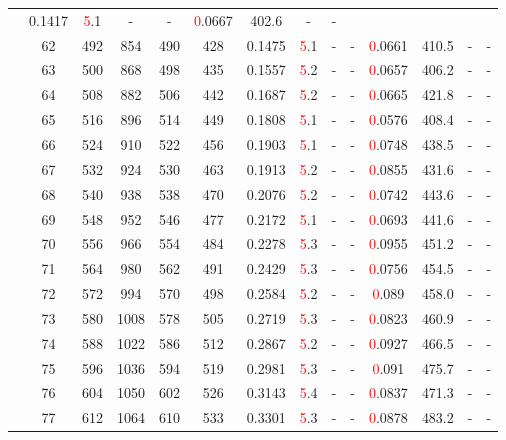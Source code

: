 \begin{table}[htb]
{\begin{tabular}{|c|c|c|c|c|c|c|c|c|c|c|c|c|c|}
 & 0.1417 & \textcolor{red}5.1
 & - & -
 & \textcolor{red}0.0667 & 402.6
 & - & -
 \\
 & 
62 & 492 & 854 & 490 & 428
 & 0.1475 & \textcolor{red}5.1
 & - & -
 & \textcolor{red}0.0661 & 410.5
 & - & -
 \\
 & 
63 & 500 & 868 & 498 & 435
 & 0.1557 & \textcolor{red}5.2
 & - & -
 & \textcolor{red}0.0657 & 406.2
 & - & -
 \\
 & 
64 & 508 & 882 & 506 & 442
 & 0.1687 & \textcolor{red}5.2
 & - & -
 & \textcolor{red}0.0665 & 421.8
 & - & -
 \\
 & 
65 & 516 & 896 & 514 & 449
 & 0.1808 & \textcolor{red}5.1
 & - & -
 & \textcolor{red}0.0576 & 408.4
 & - & -
 \\
 & 
66 & 524 & 910 & 522 & 456
 & 0.1903 & \textcolor{red}5.1
 & - & -
 & \textcolor{red}0.0748 & 438.5
 & - & -
 \\
 & 
67 & 532 & 924 & 530 & 463
 & 0.1913 & \textcolor{red}5.2
 & - & -
 & \textcolor{red}0.0855 & 431.6
 & - & -
 \\
 & 
68 & 540 & 938 & 538 & 470
 & 0.2076 & \textcolor{red}5.2
 & - & -
 & \textcolor{red}0.0742 & 443.6
 & - & -
 \\
 & 
69 & 548 & 952 & 546 & 477
 & 0.2172 & \textcolor{red}5.1
 & - & -
 & \textcolor{red}0.0693 & 441.6
 & - & -
 \\
 & 
70 & 556 & 966 & 554 & 484
 & 0.2278 & \textcolor{red}5.3
 & - & -
 & \textcolor{red}0.0955 & 451.2
 & - & -
 \\
 & 
71 & 564 & 980 & 562 & 491
 & 0.2429 & \textcolor{red}5.3
 & - & -
 & \textcolor{red}0.0756 & 454.5
 & - & -
 \\
 & 
72 & 572 & 994 & 570 & 498
 & 0.2584 & \textcolor{red}5.2
 & - & -
 & \textcolor{red}0.089 & 458.0
 & - & -
 \\
 & 
73 & 580 & 1008 & 578 & 505
 & 0.2719 & \textcolor{red}5.3
 & - & -
 & \textcolor{red}0.0823 & 460.9
 & - & -
 \\
 & 
74 & 588 & 1022 & 586 & 512
 & 0.2867 & \textcolor{red}5.2
 & - & -
 & \textcolor{red}0.0927 & 466.5
 & - & -
 \\
 & 
75 & 596 & 1036 & 594 & 519
 & 0.2981 & \textcolor{red}5.3
 & - & -
 & \textcolor{red}0.091 & 475.7
 & - & -
 \\
 & 
76 & 604 & 1050 & 602 & 526
 & 0.3143 & \textcolor{red}5.4
 & - & -
 & \textcolor{red}0.0837 & 471.3
 & - & -
 \\
 & 
77 & 612 & 1064 & 610 & 533
 & 0.3301 & \textcolor{red}5.3
 & - & -
 & \textcolor{red}0.0878 & 483.2
 & - & -
 \\

\end{tabular}}
\end{table}
